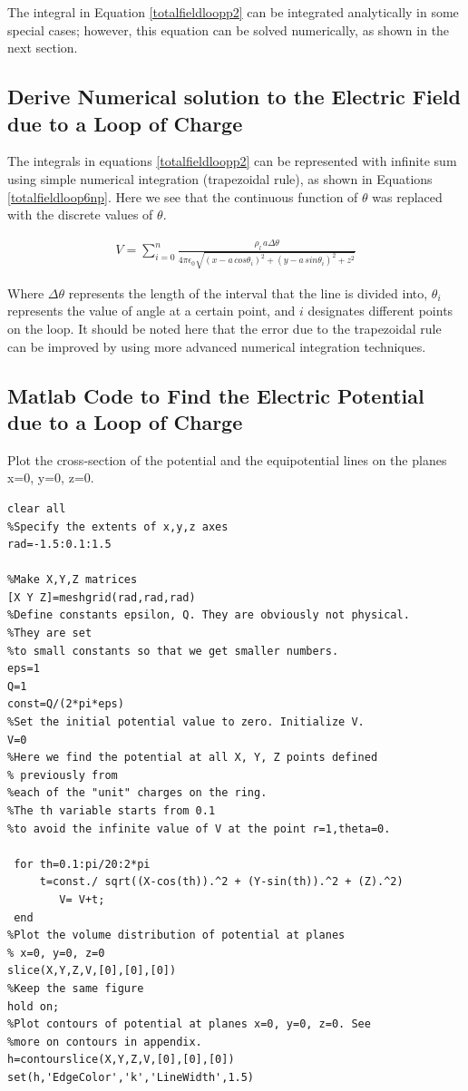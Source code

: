 \documentclass{ximera}
\begin{document}
The integral in Equation \ref{totalfieldloopp2} can be integrated analytically in some special cases; however, this equation can be solved numerically, as shown in the next section.






\subsection{Derive Numerical solution to the Electric Field due to a Loop of Charge}



The integrals in equations \ref{totalfieldloopp2} can be represented with infinite sum using simple numerical integration (trapezoidal rule), as shown in Equations \ref{totalfieldloop6np}.  Here we see that the continuous function of $\theta$ was replaced with the discrete values of  $\theta$.




\begin{eqnarray}
V=  \sum_{i=0}^{n}\frac{\rho_l \, a   \Delta \theta }{4 \pi \epsilon_{0} {  \sqrt{(x - a \,cos{\theta_i})^2 +(y - a \,sin{\theta_i})^2 +z ^2}  }}  \label{totalfieldloop6np}
\end{eqnarray}

Where $\Delta\theta$ represents the length of the interval that the line is divided into, $\theta_i$ represents the value of angle at a certain point, and $i$ designates different points on the loop. It should be noted here that the error due to the trapezoidal rule can be improved by using more advanced numerical integration techniques.


\subsection{Matlab Code to Find the Electric Potential due to a Loop of Charge }
 

 Plot the cross-section of the potential and the equipotential lines on the planes x=0, y=0, z=0. 
  \begin{verbatim}
clear all
%Specify the extents of x,y,z axes
rad=-1.5:0.1:1.5
 
%Make X,Y,Z matrices 
[X Y Z]=meshgrid(rad,rad,rad)
%Define constants epsilon, Q. They are obviously not physical. 
%They are set 
%to small constants so that we get smaller numbers.
eps=1
Q=1
const=Q/(2*pi*eps)
%Set the initial potential value to zero. Initialize V.
V=0
%Here we find the potential at all X, Y, Z points defined
% previously from
%each of the "unit" charges on the ring. 
%The th variable starts from 0.1
%to avoid the infinite value of V at the point r=1,theta=0. 
 
 for th=0.1:pi/20:2*pi
     t=const./ sqrt((X-cos(th)).^2 + (Y-sin(th)).^2 + (Z).^2)
		V= V+t;
 end
%Plot the volume distribution of potential at planes
% x=0, y=0, z=0
slice(X,Y,Z,V,[0],[0],[0])
%Keep the same figure
hold on;
%Plot contours of potential at planes x=0, y=0, z=0. See 
%more on contours in appendix.
h=contourslice(X,Y,Z,V,[0],[0],[0])
set(h,'EdgeColor','k','LineWidth',1.5)
\end{verbatim}
\end{document}
